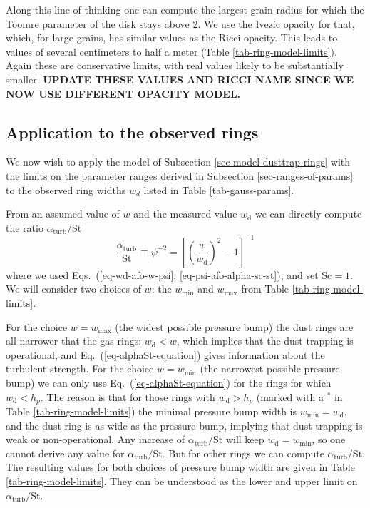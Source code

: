 \documentclass{aa}
\begin{document}
Along this line of thinking one can compute the largest grain radius for which
the Toomre parameter of the disk stays above 2. We use the Ivezic
opacity for that, which, for large grains, has similar values as the Ricci
opacity. This leads to values of several centimeters to half a meter (Table
\ref{tab-ring-model-limits}). Again these are conservative limits, with real
values likely to be substantially smaller. {\bf UPDATE THESE VALUES AND RICCI
NAME SINCE WE NOW USE DIFFERENT OPACITY MODEL.}


\subsection{Application to the observed rings}
\label{sec-application-to-rings}
%
We now wish to apply the model of Subsection \ref{sec-model-dusttrap-rings}
with the limits on the parameter ranges derived in Subsection
\ref{sec-ranges-of-params} to the observed ring widths $w_d$ listed in
Table \ref{tab-gauss-params}. 

From an assumed value of $w$ and the measured value $w_{\mathrm{d}}$ we can
directly compute the ratio $\alpha_{\mathrm{turb}}/\mathrm{St}$
\begin{equation}\label{eq-alphaSt-equation}
\frac{\alpha_{\mathrm{turb}}}{\mathrm{St}} \equiv \psi^{-2} = \left[\left(\frac{w}{w_{\mathrm{d}}}\right)^2-1\right]^{-1}
\end{equation}
where we used Eqs.~(\ref{eq-wd-afo-w-psi}, \ref{eq-psi-afo-alpha-sc-st}), and
set $\mathrm{Sc}=1$. We will consider two choices of $w$: the $w_{\mathrm{min}}$ and
$w_{\mathrm{max}}$ from Table \ref{tab-ring-model-limits}. 

For the choice $w=w_{\mathrm{max}}$ (the widest possible pressure bump) the dust
rings are all narrower that the gas rings: $w_{\mathrm{d}}<w$, which implies
that the dust trapping is operational, and Eq.~(\ref{eq-alphaSt-equation}) gives
information about the turbulent strength. For the choice $w=w_{\mathrm{min}}$
(the narrowest possible pressure bump) we can only use
Eq.~(\ref{eq-alphaSt-equation}) for the rings for which
$w_{\mathrm{d}}<h_p$. The reason is that for those rings with
$w_{\mathrm{d}}>h_p$ (marked with a $^{*}$ in Table \ref{tab-ring-model-limits})
the minimal pressure bump width is $w_{\mathrm{min}}=w_{\mathrm{d}}$, and the
dust ring is as wide as the pressure bump, implying that dust trapping is weak
or non-operational. Any increase of $\alpha_{\mathrm{turb}}/\mathrm{St}$ will
keep $w_{\mathrm{d}}=w_{\mathrm{min}}$, so one cannot derive any value for
$\alpha_{\mathrm{turb}}/\mathrm{St}$. But for other rings we can compute
$\alpha_{\mathrm{turb}}/\mathrm{St}$. The resulting values for both choices of
pressure bump width are given in Table \ref{tab-ring-model-limits}. They can be
understood as the lower and upper limit on $\alpha_{\mathrm{turb}}/\mathrm{St}$.
\end{document}
